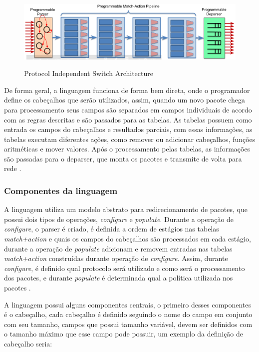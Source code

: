 \documentclass[12pt,
openright, 
oneside,
a4paper,
brazil]{facom-ufu-abntex2}
\theoremstyle{definition}
\begin{document}
\begin{figure}[h]
    \caption{Protocol Independent Switch Architecture}
    \centering
    \includegraphics[width=\textwidth]{images/pisa.png}
    \label{fig:pisa-model}
\end{figure}

De forma geral, a linguagem funciona de forma bem direta, onde o programador define
os cabeçalhos que serão utilizados, assim, quando um novo pacote chega para processamento
seus campos são separados em campos individuais de acordo com as regras descritas e são
passados para as tabelas. As tabelas possuem como entrada os campos do cabeçalhos e 
resultados parciais, com essas informações, as tabelas executam diferentes ações,
como remover ou adicionar cabeçalhos, funções aritméticas e mover valores. Após o 
processamento pelas tabelas, as informações são passadas para o deparser, que 
monta os pacotes e transmite de volta para rede \citep{p4LangTutorial}.

\subsubsection{Componentes da linguagem}

A linguagem utiliza um modelo abstrato para redirecionamento de pacotes, que possui
dois tipos de operações, \textit{configure} e \textit{populate}. Durante a operação
de \textit{configure}, o parser é criado, é definida a ordem de estágios nas tabelas
\textit{match+action} e quais os campos do cabeçalhos são processados em cada estágio,
durante a operação de \textit{populate} adicionam e removem entradas nas tabelas
\textit{match+action} construídas durante operação de \textit{configure}. Assim,
durante \textit{configure}, é definido qual protocolo será utilizado e como será
o processamento dos pacotes, e durante \textit{populate} é determinada qual a 
política utilizada nos pacotes \citep{bosshart2014p4}.

A linguagem possui alguns componentes centrais, o primeiro desses componentes 
é o cabeçalho, cada cabeçalho é definido seguindo o nome do campo em conjunto 
com seu tamanho, campos que possui tamanho variável, devem ser definidos com o
tamanho máximo que esse campo pode possuir, um exemplo da definição de cabeçalho
seria:
\end{document}
